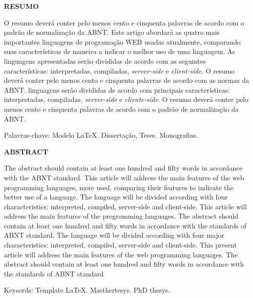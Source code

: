 
\begin{newpage}
	\thispagestyle{empty}
	\setlength{\baselineskip}{1.5\baselineskip} %
	\begin{center}
		\textbf{RESUMO} \\ [1.5\baselineskip]
	\end{center}
	\singlespace
	\noindent 
	O resumo deverá conter pelo menos cento e cinquenta palavras de acordo com o padrão de normalização da ABNT. Este artigo abordará as quatro mais importantes linguagens de programação WEB usadas atualmente, comparando suas características de maneira a indicar o melhor uso  de uma linguagem. 
	As linguagens apresentadas serão divididas de acordo com as seguintes características: interpretadas, compiladas, \textit{server-side} e \textit{client-side}. O resumo deverá conter pelo menos cento e cinquenta palavras de acordo com as normas da ABNT.
	linguagens serão divididas de acordo com principais características: interpretadas, compiladas, \textit{server-side} e \textit{cliente-side}. 
	O resumo deverá conter pelo menos cento e cinquenta palavras de acordo com o padrão de normalização da ABNT.
        \vspace{1.5\baselineskip} 
	\par
        \noindent Palavras-chave: {Modelo \LaTeX. Dissertação, Teses. Monografias.}%
\end{newpage}


{
\begin{newpage}
	\thispagestyle{empty}
	\setlength{\baselineskip}{1.5\baselineskip} %
	\begin{center}
		\textbf{ABSTRACT} \\ [1.5\baselineskip]
	\end{center}
	\singlespace
	\noindent 
	The abstract should contain at least one hundred and fifty words in accordance with the ABNT standard. This article will address the main features of the web programming 
	languages, more used, comparing their features to indicate the better use of a language. The language will be divided according with four characteristics: 
	interpreted, compiled, server-side and client-side. This article will address the main features of the programming languages. The abstract should contain at least one hundred 
	and fifty words in accordance with the standards of ABNT standard. The language will be divided according with four major characteristics: interpreted, compiled, server-side 
	and client-side. This present article will address the main features of the web programming languages. The abstract should contain at least one hundred and fifty words in 
	accordance with the standards of ABNT standard
        \vspace{1.5\baselineskip} 
	\par
        \noindent Keysords: {Template \LaTeX. Masthertesys. PhD thesys.}
\end{newpage}
}